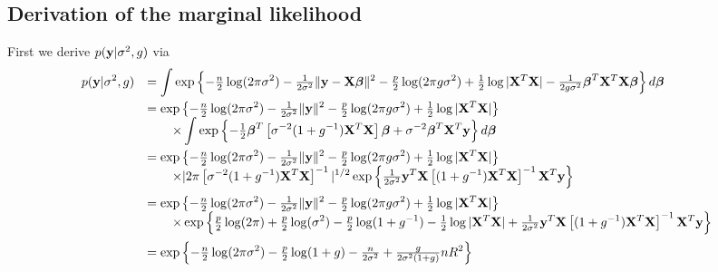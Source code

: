 \documentclass{article}
\def\vectorfontone{\bf}
\def\vectorfonttwo{\boldsymbol}
\def\vy{{\vectorfontone y}}                      %
\def\vbeta{{\vectorfonttwo \beta}}               %
\def\matrixfontone{\bf}
\def\mX{{\matrixfontone X}}                      %
\def\ds{\displaystyle}
\theoremstyle{definition}
\begin{document}
\subsection{Derivation of the marginal likelihood}




 
\noindent First we derive $p(\vy|\sigma^2,g)$ via
$$
\begin{array}{rl}
\ds p(\vy|\sigma^2,g) 
    & \ds = \int \exp\left\{
    -\tfrac{n}{2}\log(2\pi\sigma^2) - \tfrac{1}{2\sigma^2}\|\vy - \mX\vbeta\|^2
    -\tfrac{p}{2}\log(2\pi g\sigma^2) + \tfrac{1}{2}\log|\mX^T\mX| - \tfrac{1}{2g\sigma^2}\vbeta^T\mX^T\mX\vbeta
    \right\} d\vbeta
    \\ [2ex]
    & \ds = \exp\left\{
    -\tfrac{n}{2}\log(2\pi\sigma^2) - \tfrac{1}{2\sigma^2}\|\vy\|^2 -\tfrac{p}{2}\log(2\pi g\sigma^2) + \tfrac{1}{2}\log|\mX^T\mX| \right\}
    \\
    & \ds \qquad \times \int 
    \exp\left\{ - \tfrac{1}{2}\vbeta^T \left[ \sigma^{-2}(1+g^{-1})\mX^T\mX \right]\vbeta + \sigma^{-2}\vbeta^T\mX^T\vy
    \right\} d\vbeta \\ [2ex]
    & \ds = \exp\left\{
    -\tfrac{n}{2}\log(2\pi\sigma^2) - \tfrac{1}{2\sigma^2}\|\vy\|^2 -\tfrac{p}{2}\log(2\pi g\sigma^2) + \tfrac{1}{2}\log|\mX^T\mX| \right\}
    \\
    & \ds \qquad \times 
    |2\pi \left[ \sigma^{-2}(1+g^{-1})\mX^T\mX \right]^{-1}|^{1/2}\exp\left\{  \tfrac{1}{2\sigma^2}  \vy^T\mX\left[ (1+g^{-1})\mX^T\mX \right]^{-1}\mX^T\vy
    \right\}
    \\ [2ex]
    & \ds = \exp\left\{
    -\tfrac{n}{2}\log(2\pi\sigma^2) 
    - \tfrac{1}{2\sigma^2}\|\vy\|^2 
    -\tfrac{p}{2}\log(2\pi g\sigma^2) 
    + \tfrac{1}{2}\log|\mX^T\mX| \right\}
    \\
    & \ds \qquad \times 
    \exp\left\{ 
    \tfrac{p}{2}\log(2\pi) 
    + \tfrac{p}{2}\log(\sigma^2)
    - \tfrac{p}{2}\log(1+g^{-1})
    - \tfrac{1}{2}\log|\mX^T\mX| 
    + \tfrac{1}{2\sigma^2}  \vy^T\mX\left[ (1+g^{-1})\mX^T\mX \right]^{-1}\mX^T\vy
    \right\}
    \\ [2ex]
& \ds = \exp\left\{
-\tfrac{n}{2}\log(2\pi\sigma^2) 
- \tfrac{p}{2}\log(1+g)
- \tfrac{n}{2\sigma^2} 
+ \tfrac{g}{2\sigma^2(1+g)} n R^2
\right\}
\end{array}
$$
\end{document}
